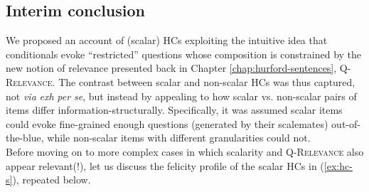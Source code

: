 	
	\subsection{Interim conclusion}
	We proposed an account of (scalar) HCs exploiting the intuitive idea that conditionals evoke ``restricted'' questions whose composition is constrained by the new notion of relevance presented back in Chapter \ref{chap:hurford-sentences}, \textsc{Q-Relevance}. The contrast between scalar and non-scalar HCs was thus captured, not \textit{via} \textit{exh} \textit{per se}, but instead by appealing to how scalar vs. non-scalar pairs of items differ information-structurally. Specifically, it was assumed scalar items could evoke fine-grained enough questions (generated by their scalemates) out-of-the-blue, while non-scalar items with different granularities could not.\\
	
	
	Before moving on to more complex cases in which scalarity and \textsc{Q-Relevance} also appear relevant(!), let us discuss the felicity profile of the scalar HCs in (\ref{ex:hc-s}), repeated below.
	
	\begin{exe}
		\begin{xlist}
		\end{xlist}
	\end{exe}
	
